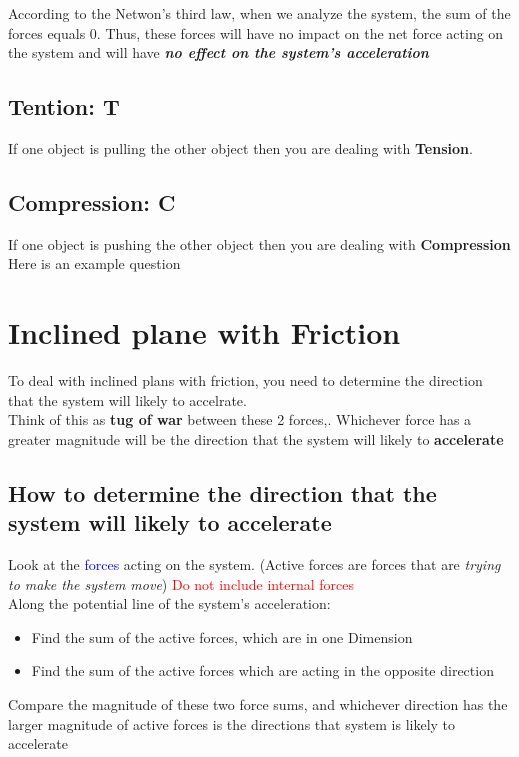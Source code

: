 According to the Netwon's third law, when we analyze the system, the sum of the forces equals 0. 
Thus, these forces will have no impact on the net force acting on the system and will have 
\textbf{\textit{no effect on the system's acceleration}}

\subsection{Tention: T}
If one object is pulling the other object then you are dealing with \textbf{Tension}.

\subsection{Compression: C}
If one object is pushing the other object then you are dealing with \textbf{Compression}
\\

Here is an example question

\section{Inclined plane with Friction}
To deal with inclined plans with friction, you need to determine the direction that the system will likely to accelrate. 
\\

Think of this as \textbf{tug of war} between these 2 forces,. Whichever force has a greater magnitude will be the direction that the system will 
likely to \textbf{accelerate}

\subsection{How to determine the direction that the system will likely to accelerate}
Look at the \textcolor{blue}{forces} acting on the system. (Active forces are forces that are \textit{trying to make the system move})
\textcolor{red}{Do not include internal forces} \\

Along the potential line of the system's acceleration:
\begin{itemize}
    \item Find the sum of the active forces, which are in one Dimension
    \item Find the sum of the active forces which are acting in the opposite direction
\end{itemize}
Compare the magnitude of these two force sums, and whichever direction has the larger magnitude of active forces is the directions that 
system is likely to accelerate

